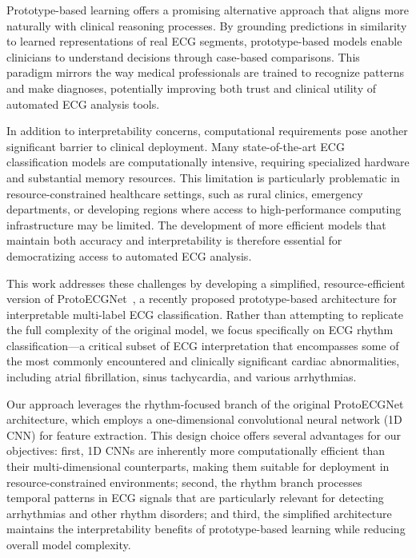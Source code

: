 Prototype-based learning offers a promising alternative approach that aligns more naturally with clinical reasoning processes. By grounding predictions in similarity to learned representations of real ECG segments, prototype-based models enable clinicians to understand decisions through case-based comparisons. This paradigm mirrors the way medical professionals are trained to recognize patterns and make diagnoses, potentially improving both trust and clinical utility of automated ECG analysis tools.

In addition to interpretability concerns, computational requirements pose another significant barrier to clinical deployment. Many state-of-the-art ECG classification models are computationally intensive, requiring specialized hardware and substantial memory resources. This limitation is particularly problematic in resource-constrained healthcare settings, such as rural clinics, emergency departments, or developing regions where access to high-performance computing infrastructure may be limited. The development of more efficient models that maintain both accuracy and interpretability is therefore essential for democratizing access to automated ECG analysis.

This work addresses these challenges by developing a simplified, resource-efficient version of ProtoECGNet~\cite{sethi2025protoecgnet}, a recently proposed prototype-based architecture for interpretable multi-label ECG classification. Rather than attempting to replicate the full complexity of the original model, we focus specifically on ECG rhythm classification—a critical subset of ECG interpretation that encompasses some of the most commonly encountered and clinically significant cardiac abnormalities, including atrial fibrillation, sinus tachycardia, and various arrhythmias.

Our approach leverages the rhythm-focused branch of the original ProtoECGNet architecture, which employs a one-dimensional convolutional neural network (1D CNN) for feature extraction. This design choice offers several advantages for our objectives: first, 1D CNNs are inherently more computationally efficient than their multi-dimensional counterparts, making them suitable for deployment in resource-constrained environments; second, the rhythm branch processes temporal patterns in ECG signals that are particularly relevant for detecting arrhythmias and other rhythm disorders; and third, the simplified architecture maintains the interpretability benefits of prototype-based learning while reducing overall model complexity.

